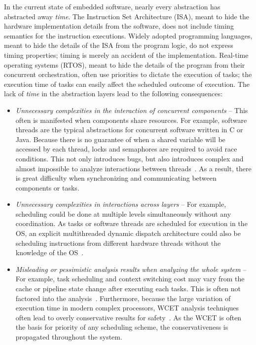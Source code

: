 In the current state of embedded software, nearly every abstraction has abstracted away \emph{time}.
The Instruction Set Architecture (ISA), meant to hide the hardware implementation details from the software, does not include timing semantics for the instruction executions.  
Widely adopted programming languages, meant to hide the details of the ISA from the program logic, do not express timing properties; timing is merely an accident of the implementation.
Real-time operating systems (RTOS), meant to hide the details of the program from their concurrent orchestration, often use priorities to dictate the execution of tasks; the execution time of tasks can easily affect the scheduled outcome of execution.
The lack of \emph{time} in the abstraction layers lead to the following consequences:
\begin{itemize}
\item \emph{Unnecessary complexities in the interaction of concurrent components} --  
This often is manifested when components share resources. 
For example, software threads are the typical abstractions for concurrent software written in C or Java. 
Because there is no guarantee of when a shared variable will be accessed by each thread, locks and semaphores are required to avoid race conditions. 
This not only introduces bugs, but also introduces complex and almost impossible to analyze interactions between threads~\cite{leethreads}. 
As a result, there is great difficulty when synchronizing and communicating between components or tasks.

\item \emph{Unnecessary complexities in interactions across layers} -- 
For example, scheduling could be done at multiple levels simultaneously without any coordination. 
As tasks or software threads are scheduled for execution in the OS, an explicit multithreaded dynamic dispatch architecture could also be scheduling instructions from different hardware threads without the knowledge of the OS~\cite{thiele:04:predictable}.

\item \emph{Misleading or pessimistic analysis results when analyzing the whole system} -- 
For example, task scheduling and context switching cost may vary from the cache or pipeline state change after executing each tasks. 
This is often not factored into the analysis~\cite{thiele:04:predictable}. 
Furthermore, because the  large variation of execution time in modern complex processors, WCET analysis techniques often lead to overly conservative results for safety~\cite{wilhelm-survey-paper}. 
As the WCET is often the basis for priority of any scheduling scheme, the conservativeness is propagated throughout the system.
\end{itemize}

